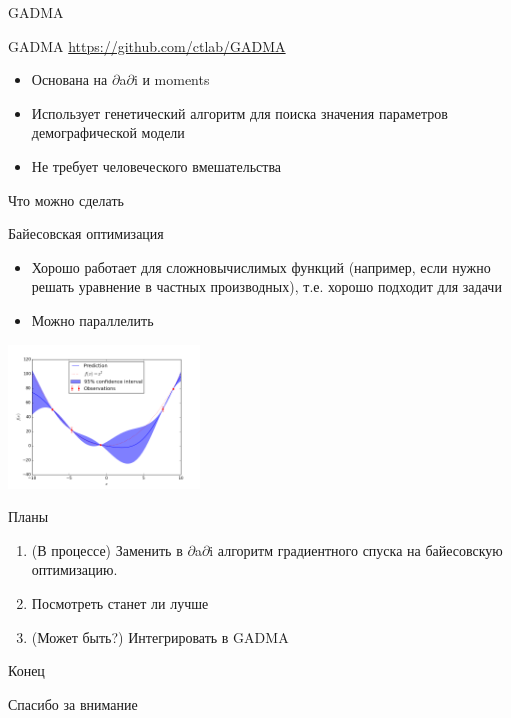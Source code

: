 \documentclass[presentation, smaller]{beamer}
\newcommand{\dadi}{$\partial$a$\partial$i\xspace }
\begin{document}
\begin{frame}[label={sec:org5e0ee3f}]{GADMA}
\begin{block}{GADMA}
\url{https://github.com/ctlab/GADMA}
\begin{itemize}
\item Основана на \dadi и moments
\item Использует генетический алгоритм для поиска значения параметров
демографической модели
\item Не требует человеческого вмешательства
\end{itemize}
\end{block}
\end{frame}

\begin{frame}[label={sec:orgc61397a}]{Что можно сделать}
\begin{block}{Байесовская оптимизация}
\begin{itemize}
\item Хорошо работает для сложновычислимых функций (например, если нужно решать
уравнение в частных производных), т.е. хорошо подходит для задачи
\item Можно параллелить
\end{itemize}
\begin{center}
\includegraphics[width=2in]{./pics/bayes.png}
\end{center}
\end{block}
\end{frame}

\begin{frame}[label={sec:orgcfabea8}]{Планы}
\begin{enumerate}
\item (В процессе) Заменить в \dadi алгоритм градиентного спуска на байесовскую оптимизацию.
\item Посмотреть станет ли лучше
\item (Может быть?) Интегрировать в GADMA
\end{enumerate}
\end{frame}

\begin{frame}[label={sec:orga07d43a}]{Конец}
\begin{center}
Спасибо за внимание
\end{center}
\end{frame}
\end{document}
